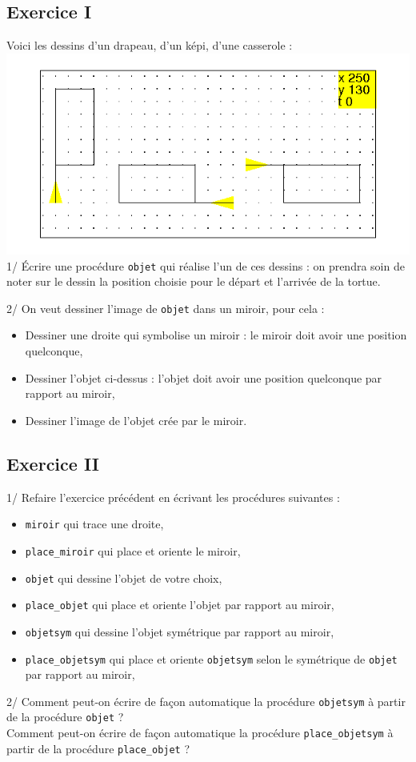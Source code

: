 \documentclass[a4paper,11pt]{book}
\begin{document}
\subsection{Exercice I}
Voici les dessins d'un drapeau, d'un k\'epi, d'une casserole :\\
%
\includegraphics[width=\textwidth]{tortkepi}\\
1/ \'Ecrire une proc\'edure {\tt objet} qui r\'ealise l'un de ces dessins : on 
prendra soin de noter sur le dessin la position choisie pour
le d\'epart et l'arriv\'ee de la tortue.

2/ On veut dessiner l'image de {\tt objet} dans un miroir, pour cela :
\begin{itemize}
\item Dessiner une droite qui symbolise un miroir : le miroir doit avoir une position quelconque,
\item Dessiner l'objet ci-dessus : l'objet doit avoir une position quelconque 
par rapport au miroir,
\item Dessiner l'image de l'objet  cr\'ee par le miroir. 
\end{itemize}

\subsection{Exercice II}
1/ Refaire l'exercice pr\'ec\'edent en \'ecrivant les proc\'edures suivantes :
\begin{itemize}
\item {\tt miroir} qui trace une droite, 
\item {\tt place\_miroir} qui place et oriente le miroir,
\item {\tt objet} qui dessine l'objet de votre choix, 
\item {\tt place\_objet} qui place et oriente l'objet par rapport au miroir,
\item {\tt objetsym} qui dessine l'objet sym\'etrique par rapport au miroir,
\item {\tt place\_objetsym} qui place et oriente {\tt objetsym} selon le
 sym\'etrique de {\tt objet} par rapport au miroir,
\end{itemize}
2/ Comment peut-on \'ecrire de fa\c{c}on automatique la proc\'edure 
{\tt objetsym} \`a partir de la proc\'edure {\tt objet} ?\\
Comment peut-on \'ecrire de fa\c{c}on automatique la proc\'edure 
{\tt place\_objetsym} \`a partir de la proc\'edure {\tt place\_objet} ?
\end{document}
